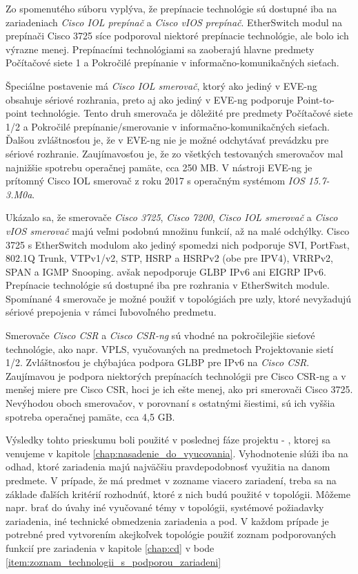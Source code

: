 Zo spomenutého súboru vyplýva, že prepínacie technológie sú dostupné iba na zariadeniach \emph{Cisco IOL prepínač} a \emph{Cisco vIOS prepínač}. EtherSwitch modul na prepínači Cisco 3725 síce podporoval niektoré prepínacie technológie, ale bolo ich výrazne menej. Prepínacími technológiami sa zaoberajú hlavne predmety Počítačové siete 1 a Pokročilé prepínanie v informačno-komunikačných sieťach.

Špeciálne postavenie má \emph{Cisco IOL smerovač}, ktorý ako jediný v EVE-ng obsahuje sériové rozhrania, preto aj ako jediný v EVE-ng podporuje Point-to-point technológie. Tento druh smerovača je dôležité pre predmety Počítačové siete 1/2 a Pokročilé prepínanie/smerovanie v informačno-komunikačných sieťach. Ďalšou zvláštnosťou je, že v EVE-ng nie je možné odchytávať prevádzku pre sériové rozhranie. Zaujímavosťou je, že zo všetkých testovaných smerovačov mal najnižšie spotrebu operačnej pamäte, cca 250 MB. V nástroji EVE-ng je prítomný Cisco IOL smerovač z roku 2017 s operačným systémom \emph{IOS 15.7-3.M0a}.

Ukázalo sa, že smerovače \emph{Cisco 3725}, \emph{Cisco 7200}, \emph{Cisco IOL smerovač} a \emph{Cisco vIOS smerovač} majú veľmi podobnú množinu funkcií, až na malé odchýlky. Cisco 3725 s EtherSwitch modulom ako jediný spomedzi nich podporuje SVI, PortFast, 802.1Q Trunk, VTPv1/v2, STP, HSRP a HSRPv2 (obe pre IPV4), VRRPv2, SPAN a IGMP Snooping. avšak nepodporuje GLBP IPv6 ani EIGRP IPv6. Prepínacie technológie sú dostupné iba pre rozhrania v EtherSwitch module. Spomínané 4 smerovače je možné použiť v topológiách pre uzly, ktoré nevyžadujú sériové prepojenia v rámci ľubovoľného predmetu.

Smerovače \emph{Cisco CSR} a \emph{Cisco CSR-ng} sú vhodné na pokročilejšie sieťové technológie, ako napr. VPLS, vyučovaných na predmetoch Projektovanie sietí 1/2. Zvláštnosťou je chýbajúca podpora GLBP pre IPv6 na \emph{Cisco CSR}. Zaujímavou je podpora niektorých prepínacích technológii pre Cisco CSR-ng a v menšej miere pre Cisco CSR, hoci je ich ešte menej, ako pri smerovači Cisco 3725. Nevýhodou oboch smerovačov, v porovnaní s ostatnými šiestimi, sú ich vyššia spotreba operačnej pamäte, cca 4,5 GB.

Výsledky tohto prieskumu boli použité v poslednej fáze projektu - , ktorej sa venujeme v kapitole \ref{chap:nasadenie_do_vyucovania}. Vyhodnotenie slúži iba na odhad, ktoré zariadenia majú najväčšiu pravdepodobnosť využitia na danom predmete. V prípade, že má predmet v zozname viacero zariadení, treba sa na základe ďalších kritérií rozhodnúť, ktoré z nich budú použité v topológii. Môžeme napr. brať do úvahy iné vyučované témy v topológii, systémové požiadavky zariadenia, iné technické obmedzenia zariadenia a pod. V každom prípade je potrebné pred vytvorením akejkoľvek topológie použiť zoznam podporovaných funkcií pre zariadenia v kapitole \ref{chap:cd} v bode \ref{item:zoznam_technologii_s_podporou_zariadeni} 